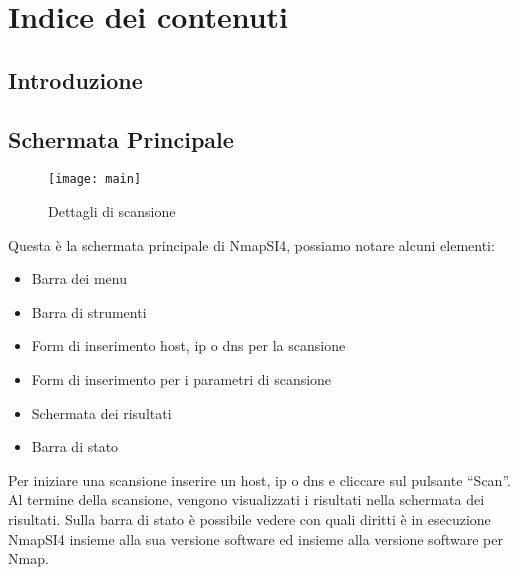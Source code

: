 
\chapter{Indice dei contenuti}
\label{ch:Contents}

\section{Introduzione}
\label{sec:ContentsIntro}


\section{Schermata Principale}
\label{sec:ContentsMain}

\begin{figure}[h]
  \centering
  \texttt{[image: main]}
  \caption{Dettagli di scansione}
  \label{fig:ContentsMainScanDetails}
\end{figure}
Questa \`e la schermata principale di NmapSI4, possiamo notare alcuni elementi:
\begin{itemize}
\item Barra dei menu
\item Barra di strumenti
\item Form di inserimento host, ip o dns per la scansione
\item Form di inserimento per i parametri di scansione
\item Schermata dei risultati
\item Barra di stato
\end{itemize}
Per iniziare una scansione inserire un host, ip o dns e cliccare sul pulsante 
``Scan''. Al termine della scansione, vengono visualizzati i risultati nella 
schermata dei risultati. Sulla barra di stato \`e possibile vedere con quali 
diritti \`e in esecuzione NmapSI4 insieme alla sua versione software ed 
insieme alla versione software per Nmap.

